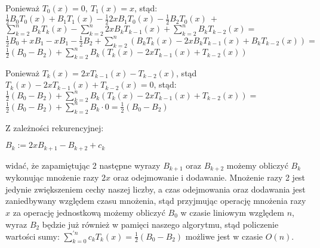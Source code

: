 \documentclass[10pt]{article}
\begin{document}
\begin{center}
\vspace{0.3em} Ponieważ $T_{0}(x) = 0, \: T_{1}(x) = x$, stąd: \\
\vspace{0.3em} $\frac{1}{2} B_{0} T_{0}(x) + B_{1} T_{1}(x) - \frac{1}{2} 2x B_{1} T_{0}(x) - \frac{1}{2} B_{2} T_{0}(x) \: +$ \\
\vspace{0.3em} $\sum_{k=2}^{n} B_{k} T_{k}(x) - \sum_{k=2}^{n} 2x B_{k} T_{k-1}(x) + \sum_{k=2}^{n} B_{k} T_{k-2}(x) =$ \\
\vspace{0.3em} $\frac{1}{2} B_{0} + x B_{1} - x B_{1} - \frac{1}{2} B_{2} + \sum_{k=2}^{n} (B_{k} T_{k}(x) - 2x B_{k} T_{k-1}(x) + B_{k} T_{k-2}(x)) =$ \\
\vspace{0.3em} $\frac{1}{2} ( B_{0} - B_{2} ) + \sum_{k=2}^{n} B_{k} (T_{k}(x) - 2x T_{k-1}(x) + T_{k-2}(x))$

\vspace{0.3em} Ponieważ $T_{k}(x) = 2x T_{k-1}(x) - T_{k-2}(x)$, stąd $T_{k}(x) - 2x T_{k-1}(x) + T_{k-2}(x) = 0$, stąd: \\

\vspace{0.3em} $\frac{1}{2} ( B_{0} - B_{2} ) + \sum_{k=2}^{n} B_{k} (T_{k}(x) - 2x T_{k-1}(x) + T_{k-2}(x)) =$ \\
\vspace{0.3em} $\frac{1}{2} ( B_{0} - B_{2} ) + \sum_{k=2}^{n} B_{k} \cdot 0 = \frac{1}{2} ( B_{0} - B_{2} )$

\end{center}
Z zależności rekurencyjnej:
\begin{center}
$B_{k} := 2x B_{k+1} - B_{k+2} + c_{k}$ 
\end{center}
widać, że zapamiętując 2 następne wyrazy $B_{k+1}$ oraz $B_{k+2}$ możemy obliczyć $B_{k}$ wykonując mnożenie razy $2x$ oraz odejmowanie i dodawanie. Mnożenie razy 2 jest jedynie zwiększeniem cechy naszej liczby, a czas odejmowania oraz dodawania jest zaniedbywany względem czasu mnożenia, stąd przyjmując operację mnożenia razy $x$ za operację jednostkową możemy obliczyć $B_{0}$ w czasie liniowym względem $n$, wyraz $B_{2}$ będzie już również w pamięci naszego algorytmu, stąd policzenie wartości sumy:
$\sum_{k=0}^{'n} c_{k} T_{k}(x) = \frac{1}{2} ( B_{0} - B_{2} )$
możliwe jest w czasie $O(n)$.
\end{document}
